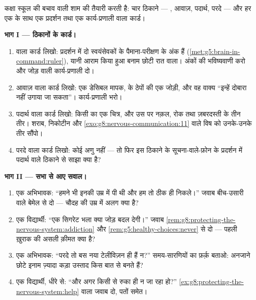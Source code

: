 \begin{problem}[{सप्ताहांत समस्या --- स्कूल की अभिभावक-और-विद्यार्थी
शाम, कार्य-प्रणालियों के साथ लिखी
हुई}]\label{pb:g8:protecting-the-nervous-system:1}
कक्षा स्कूल की बचाव वाली शाम की तैयारी करती है: चार ठिकाने --- ,
आवाज़, पदार्थ, परदे --- और हर एक के साथ एक प्रदर्शन तथा एक
कार्य-प्रणाली वाला कार्ड।

\medskip\noindent\textbf{भाग I --- ठिकानों के कार्ड।}
\begin{enumerate}
  \item {} वाला कार्ड लिखो: प्रदर्शन में दो स्वयंसेवकों के
        पैमाना-परीक्षण के अंक हैं
        (\cref{met:g5:brain-in-command:ruler}), यानी आराम किया हुआ
        बनाम छोटी रात वाला। अंकों की भविष्यवाणी करो और जोड़ वाली
        कार्य-प्रणाली दो।
  \item आवाज़ वाला कार्ड लिखो: एक डेसिबल मापक,  के ठेपों की एक
        जोड़ी, और वह वाक्य ``इन्हें दोबारा नहीं उगाया जा सकता''।
        कार्य-प्रणाली भरो।
  \item पदार्थ वाला कार्ड लिखो: किसी  का एक चित्र, और
        उस पर नक़ल, रोक तथा ज़बरदस्ती के तीन तीर। शराब, निकोटीन और
        \cref{exo:g8:nervous-communication:11} वाले विष को उनके-उनके
        तीर सौंपो।
  \item परदे वाला कार्ड लिखो: कोई अणु नहीं --- तो फिर इस ठिकाने के
        सूचना-वाले-फ़ोन के प्रदर्शन में पदार्थ वाले ठिकाने से साझा
        क्या है?
\end{enumerate}

\medskip\noindent\textbf{भाग II --- सभा से आए सवाल।}
\begin{enumerate}[resume]
  \item एक अभिभावक: ``हमने भी इनकी उम्र में पी थी और हम तो ठीक ही
        निकले।'' जवाब बीच-उसारी वाले बेमेल से दो --- चौदह की उम्र में
        अलग क्या है?
  \item एक विद्यार्थी: ``एक सिगरेट भला क्या जोड़ बदल देगी।'' जवाब
        \cref{rem:g8:protecting-the-nervous-system:addiction} और
        \cref{rem:g5:healthy-choices:never} से दो --- पहली ख़ुराक की
        असली क़ीमत क्या है?
  \item एक अभिभावक: ``परदे तो बस नया टेलीविज़न ही हैं न?''
        समय-सारणियों का फ़र्क़ बताओ: अनजाने छोटे इनाम ज़्यादा कड़ा
        उस्ताद किस बात से बनते हैं?
  \item एक विद्यार्थी, धीरे से: ``और अगर किसी से रुका ही न जा रहा
        हो?'' \cref{ex:g8:protecting-the-nervous-system:help} वाला
        जवाब दो, पतों समेत।
\end{enumerate}


\end{problem}

